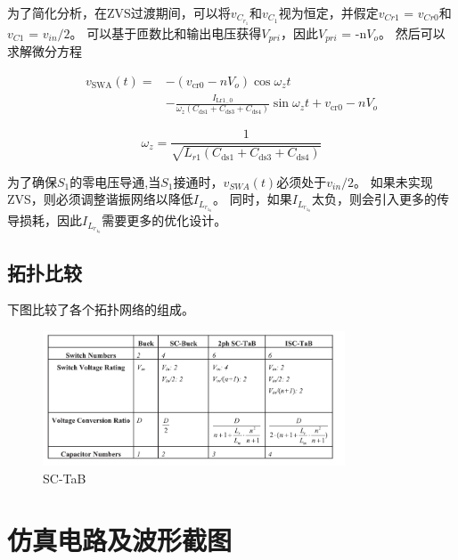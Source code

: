 \documentclass[12pt,a4paper]{report}
\begin{document}
为了简化分析，在ZVS过渡期间，可以将$v_{C_{r_1}}$和$v_{C_1}$视为恒定，并假定$v_{Cr1}$ = $v_{Cr0}$和$v_{C1}$ = $v_{in}/2$。 可以基于匝数比和输出电压获得$V_{pri}$，因此$V_{pri}$ = -n$V_{o}$。 然后可以求解微分方程

\begin{equation}
    \begin{aligned}
        v_{\mathrm{SWA}}(t)= & -\left(v_{\mathrm{cr} 0}-n V_{o}\right) \cos \omega_{z} t                                                                                                 \\
                             & -\frac{I_{\mathrm{Lr} 1_{-} 0}}{\omega_{z}\left(C_{\mathrm{ds} 1}+C_{\mathrm{ds} 3}+C_{\mathrm{ds} 4}\right)} \sin \omega_{z} t+v_{\mathrm{cr} 0}-n V_{o}
    \end{aligned}
\end{equation}

\begin{equation}
    \omega_{z}=\frac{1}{\sqrt{L_{r 1}\left(C_{\mathrm{ds} 1}+C_{\mathrm{ds} 3}+C_{\mathrm{ds} 4}\right)}}
\end{equation}

为了确保$S_1$的零电压导通,当$S_1$接通时，$v_{SWA}(t)$必须处于$v_{in}/2$。
如果未实现ZVS，则必须调整谐振网络以降低$I_{L_{r_{1_0}}}$。 同时，如果$I_{L_{r_{1_0}}}$太负，则会引入更多的传导损耗，因此$I_{L_{r_{1_0}}}$需要更多的优化设计。

\section{拓扑比较}
下图比较了各个拓扑网络的组成。

\begin{figure}[h]
    \centering
    \includegraphics[width = 0.8\textwidth]{figures/table_summary.png}
    \caption{SC-TaB}
\end{figure}

\chapter{仿真电路及波形截图}
\end{document}
